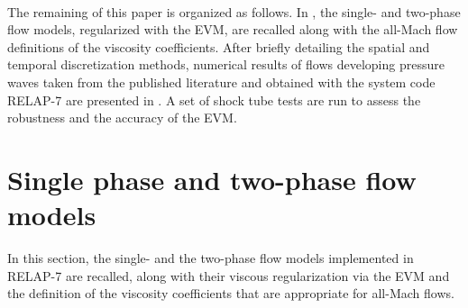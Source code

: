 \documentclass{inputs/mc2015}
\begin{document}
 \\
The remaining of this paper is organized as follows. In , the single- and two-phase flow models, regularized with the EVM, are recalled along with the all-Mach flow definitions of the viscosity coefficients. 
After briefly detailing the spatial and temporal discretization methods, numerical results of flows developing pressure waves taken from the published literature and obtained with the system code RELAP-7 are presented in . A set of shock tube tests \cite{Sokolowski-Koszela} are run to assess the robustness and the accuracy of the EVM. 
%

%
\section{Single phase and two-phase flow models}\label{sct:model}
%
In this section, the single- and the two-phase flow models implemented in RELAP-7 are recalled, along with their viscous regularization via the EVM
and the definition of the viscosity coefficients that are appropriate for all-Mach flows. %
%
\end{document}
